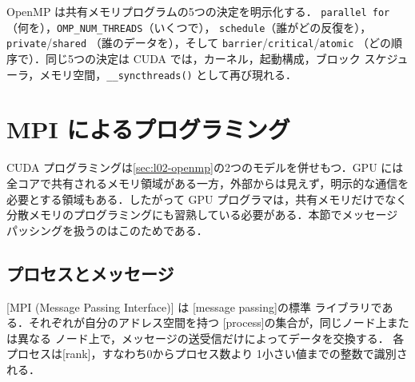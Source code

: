 \documentclass[../main.tex]{subfiles}
\begin{document}
\begin{keypoint}
  OpenMP は共有メモリプログラムの5つの決定を明示化する．
  \texttt{parallel for}（何を），\texttt{OMP\_NUM\_THREADS}（いくつで），
  \texttt{schedule}（誰がどの反復を），\texttt{private}/\texttt{shared}
  （誰のデータを），そして \texttt{barrier}/\texttt{critical}/\texttt{atomic}
  （どの順序で）．同じ5つの決定は CUDA では，カーネル，起動構成，ブロック
  スケジューラ，メモリ空間，\texttt{\_\_syncthreads()} として再び現れる．
\end{keypoint}

\section{MPI によるプログラミング}
\label{sec:l02-mpi}

CUDA プログラミングは\cref{sec:l02-openmp}の2つのモデルを併せもつ．GPU
には全コアで共有されるメモリ領域がある一方，外部からは見えず，明示的な通信を
必要とする領域もある．したがって GPU プログラマは，共有メモリだけでなく
分散メモリのプログラミングにも習熟している必要がある．本節でメッセージ
パッシングを扱うのはこのためである．

\subsection{プロセスとメッセージ}

\begin{definition}[MPI]
  [MPI (Message Passing Interface)] は
  [message passing]の標準
  ライブラリである．それぞれが自分のアドレス空間を持つ
  [process]の集合が，同じノード上または異なる
  ノード上で，メッセージの送受信だけによってデータを交換する．
  各プロセスは[rank]，すなわち0からプロセス数より
  1小さい値までの整数で識別される．
\end{definition}
\end{document}
